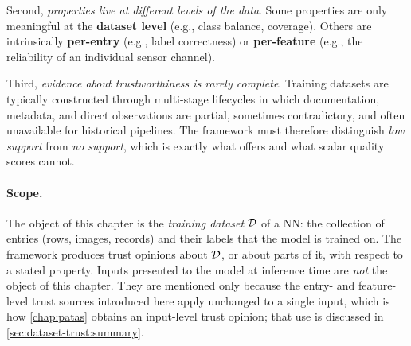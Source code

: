 Second, \emph{properties live at different levels of the data}. Some properties are only meaningful at the \textbf{dataset level} (e.g., class balance, coverage). Others are intrinsically \textbf{per-entry} (e.g., label correctness) or \textbf{per-feature} (e.g., the reliability of an individual sensor channel).

Third, \emph{evidence about trustworthiness is rarely complete}. Training datasets are typically constructed through multi-stage lifecycles in which documentation, metadata, and direct observations are partial, sometimes contradictory, and often unavailable for historical pipelines. The framework must therefore distinguish \emph{low support} from \emph{no support}, which is exactly what  offers and what scalar quality scores cannot.

\paragraph{Scope.}
The object of this chapter is the \emph{training dataset} $\mathcal{D}$ of a \ac{NN}: the collection of entries (rows, images, records) and their labels that the model is trained on. The framework produces trust opinions about $\mathcal{D}$, or about parts of it, with respect to a stated property. Inputs presented to the model at inference time are \emph{not} the object of this chapter. They are mentioned only because the entry- and feature-level trust sources introduced here apply unchanged to a single input, which is how \cref{chap:patas} obtains an input-level trust opinion; that use is discussed in \cref{sec:dataset-trust:summary}.

